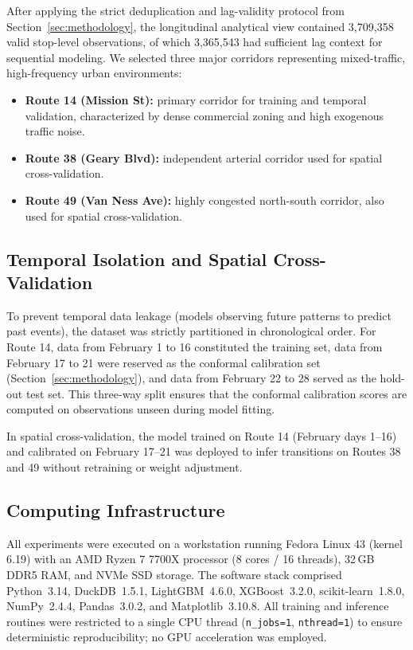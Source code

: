 \documentclass[fleqn,10pt,lineno]{wlpeerj}
\begin{document}
After applying the strict deduplication and lag-validity protocol from Section~\ref{sec:methodology}, the longitudinal analytical view
contained 3,709,358 valid stop-level observations, of which 3,365,543 had sufficient lag context for sequential modeling. We selected three major
corridors representing mixed-traffic, high-frequency urban environments:
\begin{itemize}
  \item \textbf{Route 14 (Mission St):} primary corridor for training and temporal validation,
    characterized by dense commercial zoning and high exogenous traffic noise.
  \item \textbf{Route 38 (Geary Blvd):} independent arterial corridor used for spatial
    cross-validation.
  \item \textbf{Route 49 (Van Ness Ave):} highly congested north-south corridor, also used for
    spatial cross-validation.
\end{itemize}

\subsection{Temporal Isolation and Spatial Cross-Validation}

To prevent temporal data leakage (models observing future patterns to predict past events), the
dataset was strictly partitioned in chronological order. For Route 14, data from February 1 to
16 constituted the training set, data from February 17 to 21 were reserved as the conformal
calibration set (Section~\ref{sec:methodology}), and data from February 22 to 28 served as the
hold-out test set. This three-way split ensures that the conformal calibration scores are
computed on observations unseen during model fitting.

In spatial cross-validation, the model trained on Route 14 (February days 1--16) and calibrated on February 17--21 was deployed to infer transitions on Routes 38 and 49 without retraining or weight
adjustment.

\subsection{Computing Infrastructure}

All experiments were executed on a workstation running Fedora Linux 43 (kernel 6.19) with an
AMD Ryzen 7 7700X processor (8 cores / 16 threads), 32\,GB DDR5 RAM, and NVMe SSD storage.
The software stack comprised Python~3.14, DuckDB~1.5.1, LightGBM~4.6.0, XGBoost~3.2.0,
scikit-learn~1.8.0, NumPy~2.4.4, Pandas~3.0.2, and Matplotlib~3.10.8. All training and
inference routines were restricted to a single CPU thread
(\texttt{n\_jobs=1}, \texttt{nthread=1}) to ensure deterministic reproducibility; no GPU
acceleration was employed.
\end{document}
